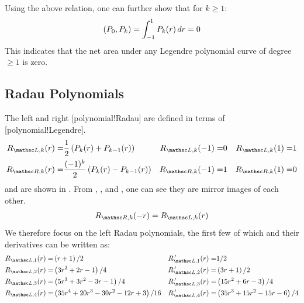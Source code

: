 
Using the above relation, one can further show that for $k \geq 1$:
\begin{gather}
    (\Leg{0},\Leg{k})
 =  \int_{-1}^{1} \Leg{k}\pvp[r] dr
 =  0
\end{gather}
This indicates that the net area under any Legendre polynomial curve
of degree $\geq 1$ is zero.


\subsection{Radau Polynomials}
\label{SEC:RadauPoly}


The left and right [polynomial!Radau]
are defined in terms of [polynomial!Legendre].
\begin{align}
    \RadL{k}\pvp[r] =& \frac{  1   }{2} \left( \Leg{k  }\pvp[r]
                                             + \Leg{k-1}\pvp[r] \right)
 &  \RadL{k}\pvp[-1] =& 0
 &  \RadL{k}\pvp[ 1] =& 1
 \nonumber %
 \\
    \RadR{k}\pvp[r] =& \frac{(-1)^k}{2} \left( \Leg{k  }\pvp[r]
                                             - \Leg{k-1}\pvp[r] \right)
    \label{EQN:RadauPoly}
 &  \RadR{k}\pvp[-1] =& 1
 &  \RadR{k}\pvp[ 1] =& 0
\end{align}
and are shown in .
%
From ,
,
and  ,
one can see they are mirror images of each other.
\begin{gather}
    \RadR{k}\pvp[-r] = \RadL{k}\pvp[r]
\end{gather}
We therefore focus on the left Radau polynomials,
the first few of which and their derivatives can be written as:
\begin{align}
     \RadL{1}\pvp[r] =& \left( r + 1 \right) / 2
 &  \dRadL{1}\pvp[r] =& 1 / 2
 \\  \RadL{2}\pvp[r] =& \left(                    3 r^2 +  2 r - 1 \right) / 4
 &  \dRadL{2}\pvp[r] =& \left(                    3 r   +  1       \right) / 2
 \\  \RadL{3}\pvp[r] =& \left(           5 r^3 +  3 r^2 -  3 r - 1 \right) / 4
 &  \dRadL{3}\pvp[r] =& \left(          15 r^2 +  6 r   -  3       \right) / 4
 \\  \RadL{4}\pvp[r] =& \left( 35 r^4 + 20 r^3 - 30 r^2 - 12 r + 3 \right) / 16
 &  \dRadL{4}\pvp[r] =& \left( 35 r^3 + 15 r^2 - 15 r   -  6       \right) / 4
\end{align}



